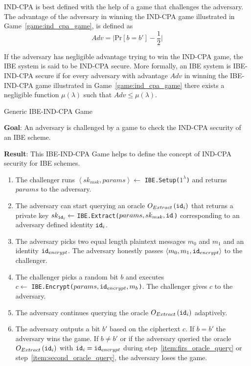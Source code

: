 IND-CPA is best defined with the help of a game that challenges the adversary. The advantage of the adversary in winning the IND-CPA game illustrated in Game~\ref{game:ind_cpa_game}, is defined as
\begin{equation*}
 Adv = \lvert \textrm{Pr} \left[ b = b' \right] - \frac{1}{2} \rvert
\end{equation*}

If the adversary has negligible advantage trying to win the IND-CPA game, the IBE system is said to be IND-CPA secure. More formally, an IBE system is IBE-IND-CPA secure if for every adversary with advantage $Adv$ in winning the IBE-IND-CPA game illustrated in Game~\ref{game:ind_cpa_game} there exists a negligible function $\mu \left( \lambda \right)$ such that $Adv \leq \mu \left( \lambda \right)$.

\begin{game}
\caption{Generic IBE-IND-CPA Game~\cite{thesis:Alfredo08}}
\label{game:ind_cpa_game}
\begin{description}
 \item \textbf{Goal}: An adversary is challenged by a game to check the IND-CPA security of an IBE scheme.
 
 \item \textbf{Result}: This IBE-IND-CPA Game helps to define the concept of IND-CPA security for IBE schemes.
\end{description}

 \begin{enumerate}
  \item The challenger runs $\left< sk_{msk}, params\right> \leftarrow$ \texttt{IBE.Setup($1^{\lambda}$)} and returns $params$ to the adversary.
  \item \label{item:firs_oracle_query} The adversary can start querying an oracle $O_{Extract} \left( \mathtt{id}_{i} \right)$ that returns a private key $sk_{\mathtt{id}_{i}} \leftarrow$ \texttt{IBE.Extract($params, sk_{msk}, \mathtt{id}_{}$)} corresponding to an adversary defined identity $\mathtt{id}_{i}$.
  \item The adversary picks two equal length plaintext messages $m_0$ and $m_1$ and an identity $\mathtt{id}_{encrypt}$. The adversary honestly passes $\left< m_0, m_1, \mathtt{id}_{encrypt} \right>$ to the challenger.
  \item The challenger picks a random bit $b$ and executes \\ $c \leftarrow$ \texttt{IBE.Encrypt($params, \mathtt{id}_{encrypt}, m_b$)}. The challenger gives $c$ to the adversary.
  \item \label{item:second_oracle_query} The adversary continues querying the oracle $O_{Extract} \left( \mathtt{id}_{i} \right)$ adaptively.
  \item The adversary outputs a bit $b'$ based on the ciphertext $c$. If $b = b'$ the adversary wins the game. If $b \neq b'$ or if the adversary queried the oracle $O_{Extract} \left( \mathtt{id}_{i} \right)$ with $\mathtt{id}_{i} = \mathtt{id}_{encrypt}$ during step~\ref{item:firs_oracle_query} or step~\ref{item:second_oracle_query}, the adversary loses the game.
 \end{enumerate}
\end{game}

